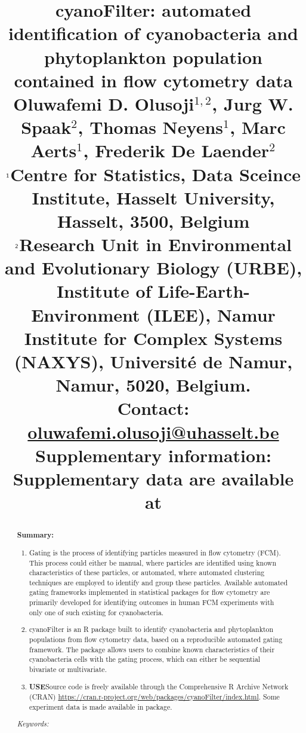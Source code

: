 \documentclass[a4paper,12pt]{extarticle}
\title{
		\begin{flushleft} 
			\Huge{cyanoFilter: automated identification of cyanobacteria and phytoplankton population contained in flow cytometry data} \\
			\vspace{0.4in} \small{Oluwafemi D. Olusoji$^{1,2}$, Jurg W. Spaak$^{2}$, Thomas Neyens$^{1}$, Marc Aerts$^{1}$, Frederik De Laender$^{2}$} \\\vspace{0.2in}			
			$^{\text{\sf 1}}$Centre for Statistics, Data Sceince Institute, Hasselt University, Hasselt, 3500, Belgium\\
			$^{\text{\sf 2}}$Research Unit in Environmental and Evolutionary Biology (URBE), Institute of Life-Earth-Environment (ILEE), Namur Institute for Complex Systems (NAXYS), Universit\'{e} de Namur, Namur, 5020, Belgium.\\\vspace{0.2in}
			\textbf{Contact:}\\ \href{oluwafemi.olusoji@uhasselt.be}{oluwafemi.olusoji@uhasselt.be}\\
			\textbf{Supplementary information:} Supplementary data are available at \textit{}
		\end{flushleft}
	}
\date{}
\begin{document}
	
	\maketitle
	\newpage
	\begin{abstract}
		\textbf{Summary:} 
		\begin{enumerate}
			\item Gating is the process of identifying particles measured in flow cytometry (FCM). This process could either be manual, where particles are identified using known characteristics of these particles, or automated, where automated clustering techniques are employed to identify and group these particles. Available automated gating frameworks implemented in statistical packages for flow cytometry are primarily developed for identifying outcomes in human FCM experiments with only one of such existing for cyanobacteria.
			
			\item cyanoFilter is an R package built to identify cyanobacteria and phytoplankton populations from flow cytometry data, based on a reproducible automated gating framework. The package allows users to combine known characteristics of their cyanobacteria cells with the gating process, which can either be sequential bivariate or multivariate.
			
			\item \textbf{USE}Source code is freely available through the Comprehensive R Archive Network (CRAN) \href{https://cran.r-project.org/web/packages/cyanoFilter/index.html}{https://cran.r-project.org/web/packages/cyanoFilter/index.html}. Some experiment data is made available in package. 
			
		\end{enumerate}

		\noindent \textit{Keywords: }
	\end{abstract}


\title{}

\maketitle
\end{document}
